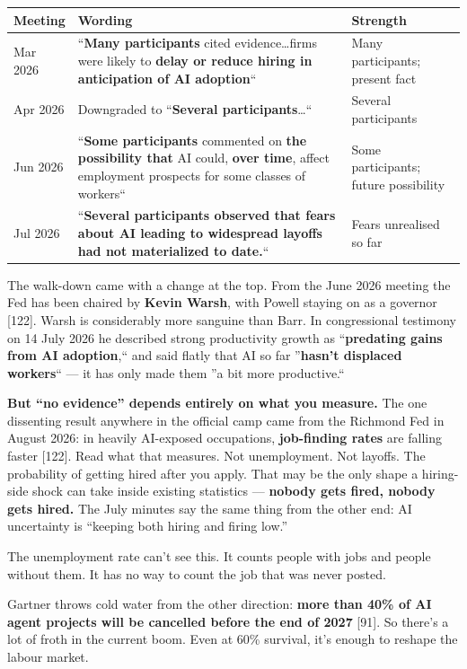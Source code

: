 \documentclass[11pt,a4paper]{article}
\begin{document}
\begin{center}

\begin{tabularx}{\textwidth}{lXX}
\toprule
Meeting & Wording & Strength \\
\midrule
Mar 2026 & ``\textbf{Many participants} cited evidence\ldots{}firms were likely to \textbf{delay or reduce hiring in anticipation of AI adoption}`` & Many participants; present fact \\
Apr 2026 & Downgraded to ``\textbf{Several participants}\ldots{}`` & Several participants \\
Jun 2026 & ``\textbf{Some participants} commented on \textbf{the possibility that} AI could, \textbf{over time}, affect employment prospects for some classes of workers`` & Some participants; future possibility \\
Jul 2026 & ``\textbf{Several participants observed that fears about AI leading to widespread layoffs had not materialized to date.}`` & Fears unrealised so far \\
\bottomrule
\end{tabularx}
\end{center}

The walk-down came with a change at the top. From the June 2026 meeting the Fed has been chaired by \textbf{Kevin Warsh}, with Powell staying on as a governor [122]. Warsh is considerably more sanguine than Barr. In congressional testimony on 14 July 2026 he described strong productivity growth as ``\textbf{predating gains from AI adoption},`` and said flatly that AI so far ''\textbf{hasn't displaced workers}`` --- it has only made them ''a bit more productive.``

\textbf{But ``no evidence'' depends entirely on what you measure.} The one dissenting result anywhere in the official camp came from the Richmond Fed in August 2026: in heavily AI-exposed occupations, \textbf{job-finding rates} are falling faster [122]. Read what that measures. Not unemployment. Not layoffs. The probability of getting hired after you apply. That may be the only shape a hiring-side shock can take inside existing statistics --- \textbf{nobody gets fired, nobody gets hired.} The July minutes say the same thing from the other end: AI uncertainty is ``keeping both hiring and firing low.''

The unemployment rate can't see this. It counts people with jobs and people without them. It has no way to count the job that was never posted.

Gartner throws cold water from the other direction: \textbf{more than 40\% of AI agent projects will be cancelled before the end of 2027}{} [91]. So there's a lot of froth in the current boom. Even at 60\% survival, it's enough to reshape the labour market.
\end{document}

